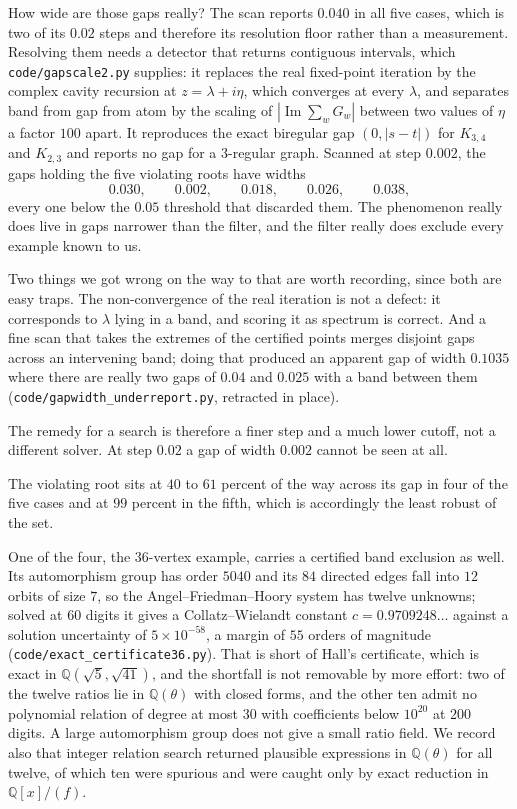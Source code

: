 \documentclass[11pt]{article}
\theoremstyle{remark}
\begin{document}
How wide are those gaps really? The scan reports $0.040$ in all five cases, which is two of its
$0.02$ steps and therefore its resolution floor rather than a measurement. Resolving them needs a
detector that returns contiguous intervals, which \texttt{code/gapscale2.py} supplies: it replaces
the real fixed-point iteration by the complex cavity recursion at $z=\lambda+i\eta$, which converges
at every $\lambda$, and separates band from gap from atom by the scaling of
$|\operatorname{Im}\sum_wG_w|$ between two values of $\eta$ a factor $100$ apart. It reproduces the
exact biregular gap $(0,|s-t|)$ for $K_{3,4}$ and $K_{2,3}$ and reports no gap for a $3$-regular
graph. Scanned at step $0.002$, the gaps holding the five violating roots have widths
\[
  0.030,\qquad 0.002,\qquad 0.018,\qquad 0.026,\qquad 0.038,
\]
every one below the $0.05$ threshold that discarded them. The phenomenon really does live in gaps
narrower than the filter, and the filter really does exclude every example known to us.

Two things we got wrong on the way to that are worth recording, since both are easy traps. The
non-convergence of the real iteration is not a defect: it corresponds to $\lambda$ lying in a band,
and scoring it as spectrum is correct. And a fine scan that takes the extremes of the certified
points merges disjoint gaps across an intervening band; doing that produced an apparent gap of width
$0.1035$ where there are really two gaps of $0.04$ and $0.025$ with a band between them
(\texttt{code/gapwidth\_underreport.py}, retracted in place).

The remedy for a search is therefore a finer step and a much lower cutoff, not a different solver.
At step $0.02$ a gap of width $0.002$ cannot be seen at all.

The violating root sits at $40$ to $61$ percent of the way across its gap in four of the five cases
and at $99$ percent in the fifth, which is accordingly the least robust of the set.

One of the four, the $36$-vertex example, carries a certified band exclusion as well. Its
automorphism group has order $5040$ and its $84$ directed edges fall into $12$ orbits of size $7$,
so the Angel--Friedman--Hoory system has twelve unknowns; solved at $60$ digits it gives a
Collatz--Wielandt constant $c=0.9709248\ldots$ against a solution uncertainty of $5\times10^{-58}$,
a margin of $55$ orders of magnitude (\texttt{code/exact\_certificate36.py}). That is short of
Hall's certificate, which is exact in $\mathbb{Q}(\sqrt5,\sqrt{41})$, and the shortfall is not
removable by more effort: two of the twelve ratios lie in $\mathbb{Q}(\theta)$ with closed forms,
and the other ten admit no polynomial relation of degree at most $30$ with coefficients below
$10^{20}$ at $200$ digits. A large automorphism group does not give a small ratio field. We record
also that integer relation search returned plausible expressions in $\mathbb{Q}(\theta)$ for all
twelve, of which ten were spurious and were caught only by exact reduction in
$\mathbb{Q}[x]/(f)$.
\end{document}
